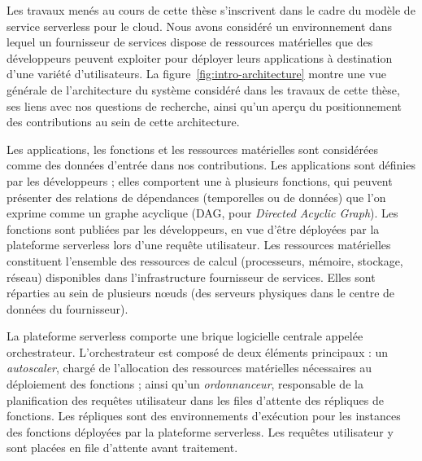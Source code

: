 Les travaux menés au cours de cette thèse s'inscrivent dans le cadre du modèle de service serverless pour le cloud. Nous avons considéré un environnement dans lequel un fournisseur de services dispose de ressources matérielles que des développeurs peuvent exploiter pour déployer leurs applications à destination d'une variété d'utilisateurs. %
La figure~\ref{fig:intro-architecture} montre une vue générale de l'architecture du système considéré dans les travaux de cette thèse, ses liens avec nos questions de recherche, ainsi qu'un aperçu du positionnement des contributions au sein de cette architecture.

Les applications, les fonctions et les ressources matérielles sont considérées comme des données d'entrée dans nos contributions. Les applications sont définies par les développeurs ; elles comportent une à plusieurs fonctions, qui peuvent présenter des relations de dépendances (temporelles ou de données) que l'on exprime comme un graphe acyclique (DAG, pour \textit{Directed Acyclic Graph}). Les fonctions sont publiées par les développeurs, en vue d'être déployées par la plateforme serverless lors d'une requête utilisateur. Les ressources matérielles constituent l'ensemble des ressources de calcul (processeurs, mémoire, stockage, réseau) disponibles dans l'infrastructure fournisseur de services. Elles sont réparties au sein de plusieurs nœuds (des serveurs physiques dans le centre de données du fournisseur).

La plateforme serverless comporte une brique logicielle centrale appelée orchestrateur. L'orchestrateur est composé de deux éléments principaux : un \textit{autoscaler}, chargé de l'allocation des ressources matérielles nécessaires au déploiement des fonctions ; ainsi qu'un \textit{ordonnanceur}, responsable de la planification des requêtes utilisateur dans les files d'attente des répliques de fonctions. Les répliques sont des environnements d'exécution pour les instances des fonctions déployées par la plateforme serverless. Les requêtes utilisateur y sont placées en file d'attente avant traitement.


